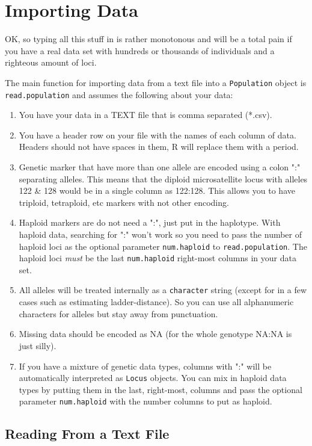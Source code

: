 \documentclass[letterpaper,twoside,openany]{book}
\begin{document}
\section{Importing Data}

OK, so typing all this stuff in is rather monotonous and will be a total pain if you have a real data set with hundreds or thousands of individuals and a righteous amount of loci.  

The main function for importing data from a text file into a \texttt{Population} object is \texttt{read.population} and assumes the following about your data:
\begin{enumerate}
	\item You have your data in a TEXT file that is comma separated (*.csv).  
	\item You have a header row on your file with the names of each column of data.  Headers should not have spaces in them, R will replace them with a period.
	\item Genetic marker that have more than one allele are encoded using a colon ":" separating alleles.  This means that the diploid microsatellite locus with alleles 122 \& 128 would be in a single column as 122:128.  This allows you to have triploid, tetraploid, etc markers with not other encoding.
	\item Haploid markers are do not need a ":", just put in the haplotype.  With haploid data, searching for ":" won't work so you need to pass the number of haploid loci as the optional parameter \texttt{num.haploid} to \texttt{read.population}.  The haploid loci \emph{must} be the last \texttt{num.haploid} right-most columns in your data set.
	\item All alleles will be treated internally as a \texttt{character} string (except for in a few cases such as estimating ladder-distance).  So you can use all alphanumeric characters for alleles but stay away from punctuation.
	\item Missing data should be encoded as NA (for the whole genotype NA:NA is just silly).
	\item If you have a mixture of genetic data types, columns with ":" will be automatically interpreted as \texttt{Locus} objects.  You can mix in haploid data types by putting them in the last, right-most, columns and pass the optional parameter \texttt{num.haploid} with the number columns to put as haploid.
\end{enumerate}

\subsection{Reading From a Text File}
\end{document}
